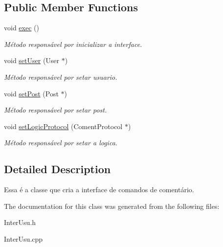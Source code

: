 \subsection*{Public Member Functions}
\begin{DoxyCompactItemize}
\item 
\hypertarget{class_coment_controler_a3717c8a74f5091b6af228388b15f8259}{void \hyperlink{class_coment_controler_a3717c8a74f5091b6af228388b15f8259}{exec} ()}\label{class_coment_controler_a3717c8a74f5091b6af228388b15f8259}

\begin{DoxyCompactList}\small\item\em Método responsável por inicializar a interface. \end{DoxyCompactList}\item 
\hypertarget{class_coment_controler_a6438b12dbad045d3437978e6fd875159}{void \hyperlink{class_coment_controler_a6438b12dbad045d3437978e6fd875159}{set\-User} (User $\ast$)}\label{class_coment_controler_a6438b12dbad045d3437978e6fd875159}

\begin{DoxyCompactList}\small\item\em Método responsável por setar usuario. \end{DoxyCompactList}\item 
\hypertarget{class_coment_controler_a24dea8665cd60a397c83527f0b179210}{void \hyperlink{class_coment_controler_a24dea8665cd60a397c83527f0b179210}{set\-Post} (Post $\ast$)}\label{class_coment_controler_a24dea8665cd60a397c83527f0b179210}

\begin{DoxyCompactList}\small\item\em Método responsável por setar post. \end{DoxyCompactList}\item 
\hypertarget{class_coment_controler_a297cdd6c8e43c69d092d78f2db56645a}{void \hyperlink{class_coment_controler_a297cdd6c8e43c69d092d78f2db56645a}{set\-Logic\-Protocol} (Coment\-Protocol $\ast$)}\label{class_coment_controler_a297cdd6c8e43c69d092d78f2db56645a}

\begin{DoxyCompactList}\small\item\em Método responsável por setar a logica. \end{DoxyCompactList}\end{DoxyCompactItemize}


\subsection{Detailed Description}
Essa é a classe que cria a interface de comandos de comentário. 

The documentation for this class was generated from the following files\-:\begin{DoxyCompactItemize}
\item 
Inter\-Usu.\-h\item 
Inter\-Usu.\-cpp\end{DoxyCompactItemize}
